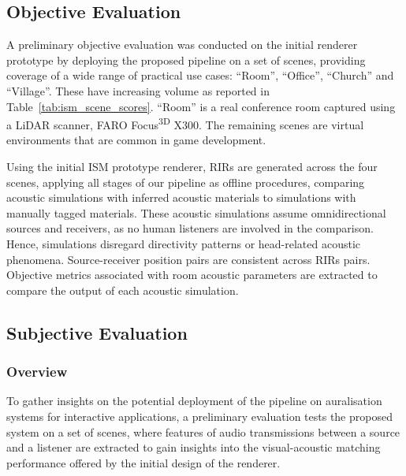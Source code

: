 \subsection{Objective Evaluation}
A preliminary objective evaluation was conducted on the initial renderer prototype by deploying the proposed pipeline on a set of scenes, providing coverage of a wide range of practical use cases: ``Room'', ``Office'', ``Church'' and ``Village''. These have increasing volume as reported in Table~\ref{tab:ism_scene_scores}. ``Room'' is a real conference room captured using a LiDAR scanner, FARO Focus\textsuperscript{3D} X300. The remaining scenes are virtual environments that are common in game development. \par
Using the initial ISM prototype renderer, RIRs are generated across the four scenes, applying all stages of our pipeline as offline procedures, comparing acoustic simulations with inferred acoustic materials to simulations with manually tagged materials. These acoustic simulations assume omnidirectional sources and receivers, as no human listeners are involved in the comparison. Hence, simulations disregard directivity patterns or head-related acoustic phenomena. Source-receiver position pairs are consistent across RIRs pairs. Objective metrics associated with room acoustic parameters are extracted to compare the output of each acoustic simulation.\par

\subsection{Subjective Evaluation}
\subsubsection{Overview}
To gather insights on the potential deployment of the pipeline on auralisation systems for interactive applications, a preliminary evaluation tests the proposed system on a set of scenes, where features of audio transmissions between a source and a listener are extracted to gain insights into the visual-acoustic matching performance offered by the initial design of the renderer. \par

